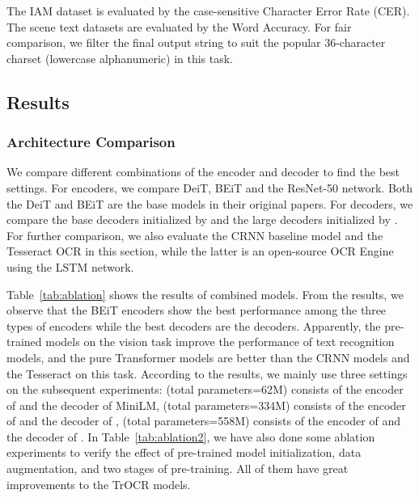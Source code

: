 \documentclass[letterpaper]{article} \usepackage{aaai23}  \usepackage{times}  \usepackage{helvet}  \usepackage{courier}  \usepackage[hyphens]{url}  \usepackage{graphicx} \urlstyle{rm} \def\UrlFont{\rm}  \usepackage{natbib}  \usepackage{caption} \frenchspacing  \setlength{\pdfpagewidth}{8.5in} \setlength{\pdfpageheight}{11in} \usepackage{algorithm}
\begin{document}
  


The IAM dataset is evaluated by the case-sensitive Character Error Rate (CER).
The scene text datasets are evaluated by the Word Accuracy. For fair comparison, we filter the final output string to suit the popular 36-character charset (lowercase alphanumeric) in this task.






\subsection{Results}

\subsubsection{Architecture Comparison}

We compare different combinations of the encoder and decoder to find the best settings. For encoders, we compare DeiT, BEiT and the ResNet-50 network. Both the DeiT and BEiT are the base models in their original papers. For decoders, we compare the base decoders initialized by  and the large decoders initialized by . 
For further comparison, we also evaluate the CRNN baseline model and the Tesseract OCR in this section, while the latter is an open-source OCR Engine using the LSTM network.


Table~\ref{tab:ablation} shows the results of combined models. From the results, we observe that the BEiT encoders show the best performance among the three types of encoders while the best decoders are the  decoders. Apparently, the pre-trained models on the vision task improve the performance of text recognition models, and the pure Transformer models are better than the CRNN models and the Tesseract on this task. According to the results, we mainly use three settings on the subsequent experiments:  (total parameters=62M) consists of the encoder of  and the decoder of MiniLM,  (total parameters=334M) consists of the encoder of  and the decoder of ,  (total parameters=558M) consists of the encoder of  and the decoder of . In Table~\ref{tab:ablation2}, we have also done some ablation experiments to verify the effect of pre-trained model initialization, data augmentation, and two stages of pre-training. All of them have great improvements to the TrOCR models.
\end{document}
